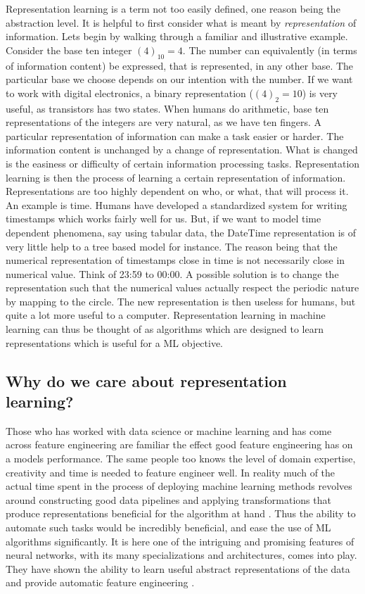 \documentclass[../../thesis.tex]{subfiles}
\begin{document}
Representation learning is a term not too easily defined, one reason being the abstraction level. It is helpful to first consider what is meant by \textit{representation} of information. Lets begin by walking through a familiar and illustrative example. Consider the base ten integer $(4)_{10} = 4$. The number can equivalently (in terms of information content) be expressed, that is represented, in any other base. The particular base we choose depends on our intention with the number. If we want to work with digital electronics, a binary representation ($(4)_{2} = 10$) is very useful, as transistors has two states. When humans do arithmetic, base ten representations of the integers are very natural, as we have ten fingers. A particular representation of information can make a task easier or harder. The information content is unchanged by a change of representation. What is changed is the easiness or difficulty of certain information processing tasks. Representation learning is then the process of learning a certain representation of information. \newline
Representations are too highly dependent on who, or what, that will process it. An example is time. Humans have developed a standardized system for writing timestamps which works fairly well for us. But, if we want to model time dependent phenomena, say using tabular data, the DateTime representation is of very little help to a tree based model for instance. The reason being that the numerical representation of timestamps close in time is not necessarily close in numerical value. Think of 23:59 to 00:00. A possible solution is to change the representation such that the numerical values actually respect the periodic nature by mapping to the circle. The new representation is then useless for humans, but quite a lot more useful to a computer. Representation learning in machine learning can thus be thought of as algorithms which are designed to learn representations which is useful for a ML objective.

\subsection{Why do we care about representation learning?}
Those who has worked with data science or machine learning and has come across feature engineering are familiar the effect good feature engineering has on a models performance. The same people too knows the level of domain expertise, creativity and time is needed to feature engineer well. In reality much of the actual time spent in the process of deploying machine learning methods revolves around constructing good data pipelines and applying transformations that produce representations beneficial for the algorithm at hand \cite{Rep-rev-persp}. Thus the ability to automate such tasks would be incredibly beneficial, and ease the use of ML algorithms significantly. It is here one of the intriguing and promising features of neural networks, with its many specializations and architectures, comes into play. They have shown the ability to learn useful abstract representations of the data and provide automatic feature engineering \cite{Rep-rev-persp}. 
\end{document}
